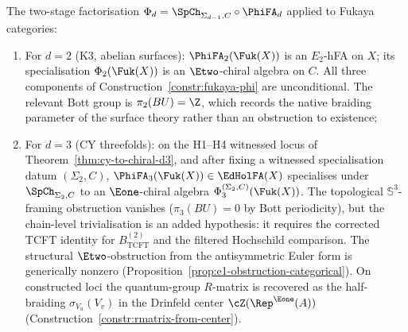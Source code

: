 \begin{proposition}
\label{prop:fukaya-phi-status}
The two-stage factorisation $\Phi_d = \SpCh_{\Sigma_{d-1}, C} \circ \PhiFA_d$
applied to Fukaya categories:
\begin{enumerate}[label=(\roman*)]
 \item For $d = 2$ (K3, abelian surfaces): $\PhiFA_2(\Fuk(X))$ is an
 $E_2$-hFA on $X$; its specialisation $\Phi_2(\Fuk(X))$ is an
 $\Etwo$-chiral algebra on $C$. All three components of
 Construction~\ref{constr:fukaya-phi} are unconditional. The
 relevant Bott group is $\pi_2(BU) = \Z$, which records the native
 braiding parameter of the surface theory rather than an obstruction
 to existence;
 \item For $d = 3$ (CY threefolds): on the H1--H4 witnessed locus of
 Theorem~\ref{thm:cy-to-chiral-d3}, and after fixing a witnessed
 specialisation datum $(\Sigma_2,C)$,
 $\PhiFA_3(\Fuk(X)) \in \EdHolFA(X)$ specialises under
 $\SpCh_{\Sigma_2, C}$ to an $\Eone$-chiral algebra
 $\Phi_3^{(\Sigma_2,C)}(\Fuk(X))$. The topological
 $\mathbb{S}^3$-framing obstruction vanishes
 ($\pi_3(BU) = 0$ by Bott periodicity), but the chain-level
 trivialisation is an added hypothesis: it requires the corrected
 TCFT identity for $B^{(2)}_{\mathrm{TCFT}}$ and the filtered
 Hochschild comparison. The structural $\Etwo$-obstruction from the
 antisymmetric Euler form is generically nonzero
 (Proposition~\ref{prop:e1-obstruction-categorical}). On constructed
 loci the quantum-group $R$-matrix is recovered as the half-braiding
 $\sigma_{V_u}(V_v)$ in the Drinfeld center
 $\cZ(\Rep^{\Eone}(A))$ (Construction~\ref{constr:rmatrix-from-center}).
\end{enumerate}
\end{proposition}

